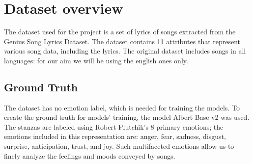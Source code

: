 \chapter{Dataset overview}
\label{ch:capitolo1}

The dataset used for the project is a set of lyrics of songs extracted
from the Genius Song Lyrics Dataset\textsuperscript{\cite{geniusdataset}}.
The dataset contains 11 attributes
that represent various song data, including the lyrics.
The original dataset includes songs in all languages: for our aim
we will be using the english ones only. 

\section{Ground Truth}
The dataset has no emotion label, which is needed for training the models.
To create the ground truth for models' training, the model
Albert Base v2\textsuperscript{\cite{albert-base-v2}} was used.
The stanzas are labeled using Robert Plutchik's 8 primary emotions;
the emotions included in this representation are:
anger, fear, sadness, disgust, surprise, anticipation, trust, and joy.
Such multifaceted emotions allow us to finely analyze the feelings and
moods conveyed by songs.